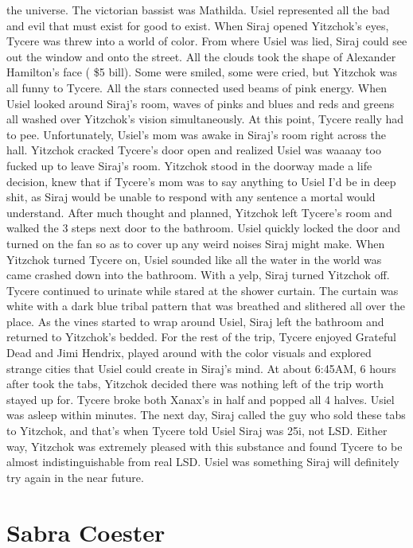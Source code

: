 \documentclass[12pt]{book}
\begin{document}
the universe. The victorian bassist was Mathilda. Usiel represented all the bad and evil that must exist for good to exist. When Siraj opened Yitzchok's eyes, Tycere was threw into a world of color. From where Usiel was lied, Siraj could see out the window and onto the street. All the clouds took the shape of Alexander Hamilton's face ( \$5 bill). Some were smiled, some were cried, but Yitzchok was all funny to Tycere. All the stars connected used beams of pink energy. When Usiel looked around Siraj's room, waves of pinks and blues and reds and greens all washed over Yitzchok's vision simultaneously. At this point, Tycere really had to pee. Unfortunately, Usiel's mom was awake in Siraj's room right across the hall. Yitzchok cracked Tycere's door open and realized Usiel was waaaay too fucked up to leave Siraj's room. Yitzchok stood in the doorway made a life decision, knew that if Tycere's mom was to say anything to Usiel I'd be in deep shit, as Siraj would be unable to respond with any sentence a mortal would understand. After much thought and planned, Yitzchok left Tycere's room and walked the 3 steps next door to the bathroom. Usiel quickly locked the door and turned on the fan so as to cover up any weird noises Siraj might make. When Yitzchok turned Tycere on, Usiel sounded like all the water in the world was came crashed down into the bathroom. With a yelp, Siraj turned Yitzchok off. Tycere continued to urinate while stared at the shower curtain. The curtain was white with a dark blue tribal pattern that was breathed and slithered all over the place. As the vines started to wrap around Usiel, Siraj left the bathroom and returned to Yitzchok's bedded. For the rest of the trip, Tycere enjoyed Grateful Dead and Jimi Hendrix, played around with the color visuals and explored strange cities that Usiel could create in Siraj's mind. At about 6:45AM, 6 hours after took the tabs, Yitzchok decided there was nothing left of the trip worth stayed up for. Tycere broke both Xanax's in half and popped all 4 halves. Usiel was asleep within minutes. The next day, Siraj called the guy who sold these tabs to Yitzchok, and that's when Tycere told Usiel Siraj was 25i, not LSD. Either way, Yitzchok was extremely pleased with this substance and found Tycere to be almost indistinguishable from real LSD. Usiel was something Siraj will definitely try again in the near future.



\chapter{Sabra Coester}
\end{document}

